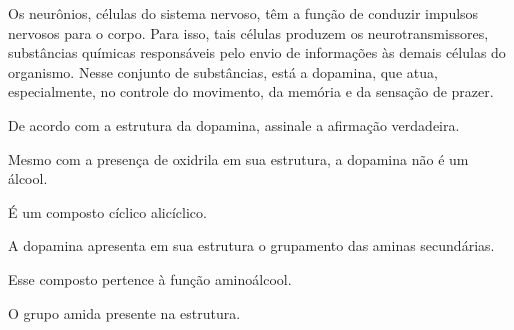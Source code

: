\documentclass[11pt]{scrartcl}
\begin{document}
\begin{exercise}[points=1]
Os neurônios, células do sistema nervoso, têm a função de conduzir impulsos nervosos para o corpo. Para isso, tais células produzem os neurotransmissores, substâncias químicas responsáveis pelo envio de informações às demais células do organismo. Nesse conjunto de substâncias, está a dopamina, que atua, especialmente, no controle do movimento, da memória e da sensação de prazer.

\begin{center}
\end{center}

De acordo com a estrutura da dopamina, assinale a afirmação verdadeira.

\begin{choice}
\choice  Mesmo com a presença de oxidrila em sua estrutura, a dopamina não é um álcool. 

\choice É um composto cíclico alicíclico. 

\choice A dopamina apresenta em sua estrutura o grupamento das aminas secundárias.

\choice Esse composto pertence à função aminoálcool.

\choice O grupo amida presente na estrutura.
\end{choice}
\end{exercise}
\end{document}
